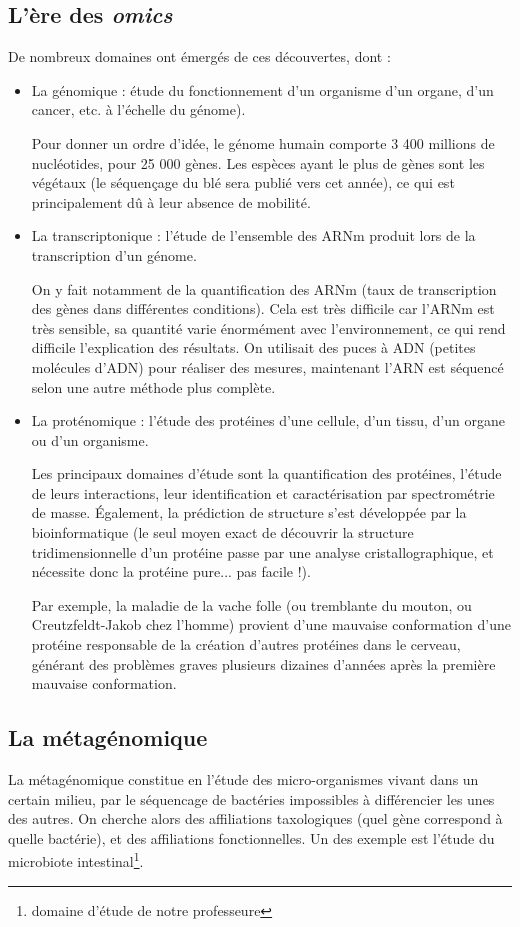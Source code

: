 \documentclass{article}
\begin{document}
\subsection{L'ère des \emph{omics}}
De nombreux domaines ont émergés de ces découvertes, dont :
\begin{itemize}
\item La génomique : étude du fonctionnement d'un organisme d'un organe, d'un cancer, etc. à l'échelle du génome).

Pour donner un ordre d'idée, le génome humain comporte 3 400 millions de nucléotides, pour 25 000 gènes. Les espèces ayant le plus de gènes sont les végétaux (le séquençage du blé sera publié vers cet année), ce qui est principalement dû à leur absence de mobilité.
\item La transcriptonique : l'étude de l'ensemble des ARNm produit lors de la transcription d'un génome.

On y fait notamment de la quantification des ARNm (taux de transcription des gènes dans différentes conditions). Cela est très difficile car l'ARNm est très sensible, sa quantité varie énormément avec l'environnement, ce qui rend difficile l'explication des résultats. On utilisait des puces à ADN (petites molécules d'ADN) pour réaliser des mesures, maintenant l'ARN est séquencé selon une autre méthode plus complète.

\item La proténomique : l'étude des protéines d'une cellule, d'un tissu, d'un organe ou d'un organisme.

Les principaux domaines d'étude sont la quantification des protéines, l'étude de leurs interactions, leur identification et caractérisation par spectrométrie de masse. Également, la prédiction de structure s'est développée par la bioinformatique (le seul moyen exact de découvrir la structure tridimensionnelle d'un protéine passe par une analyse cristallographique, et nécessite donc la protéine pure... pas facile !).

Par exemple, la maladie de la vache folle (ou tremblante du mouton, ou Creutzfeldt-Jakob chez l'homme) provient d'une mauvaise conformation d'une protéine responsable de la création d'autres protéines dans le cerveau, générant des problèmes graves plusieurs dizaines d'années après la première mauvaise conformation.
\end{itemize}

\subsection{La métagénomique}
La métagénomique constitue en l'étude des micro-organismes vivant dans un certain milieu, par le séquencage de bactéries impossibles à différencier les unes des autres. On cherche alors des affiliations taxologiques (quel gène correspond à quelle bactérie), et des affiliations fonctionnelles. Un des exemple est l'étude du microbiote intestinal\footnote{domaine d'étude de notre professeure}. 
\end{document}
